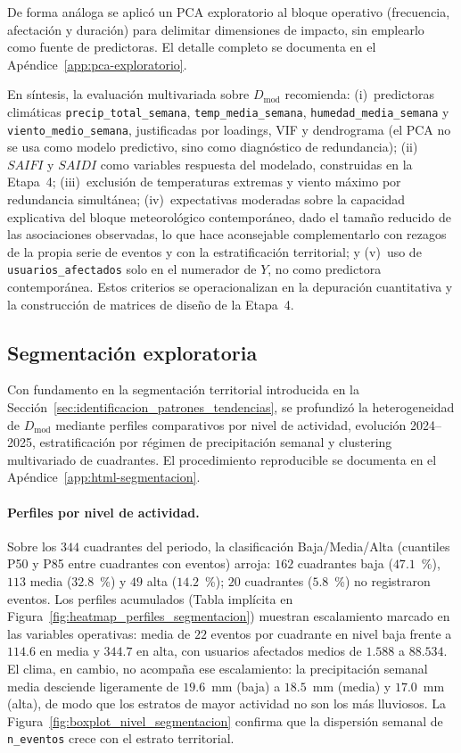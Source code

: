     De forma análoga se aplicó un PCA exploratorio al bloque operativo (frecuencia, afectación y duración) para delimitar dimensiones de impacto, sin emplearlo como fuente de predictoras. El detalle completo se documenta en el Apéndice~\ref{app:pca-exploratorio}.
    
    \noindent En síntesis, la evaluación multivariada sobre $D_{\mathrm{mod}}$ recomienda: (i)~predictoras climáticas \texttt{precip\_total\_semana}, \texttt{temp\_media\_semana}, \texttt{humedad\_media\_semana} y \texttt{viento\_medio\_semana}, justificadas por loadings, VIF y dendrograma (el PCA no se usa como modelo predictivo, sino como diagnóstico de redundancia); (ii)~$SAIFI$ y $SAIDI$ como variables respuesta del modelado, construidas en la Etapa~4; (iii)~exclusión de temperaturas extremas y viento máximo por redundancia simultánea; (iv)~expectativas moderadas sobre la capacidad explicativa del bloque meteorológico contemporáneo, dado el tamaño reducido de las asociaciones observadas, lo que hace aconsejable complementarlo con rezagos de la propia serie de eventos y con la estratificación territorial; y (v)~uso de \texttt{usuarios\_afectados} solo en el numerador de $Y$, no como predictora contemporánea. Estos criterios se operacionalizan en la depuración cuantitativa y la construcción de matrices de diseño de la Etapa~4.
    
\subsection{Segmentación exploratoria}
\label{sec:segmentacion_exploratoria}
    Con fundamento en la segmentación territorial introducida en la Sección~\ref{sec:identificacion_patrones_tendencias}, se profundizó la heterogeneidad de $D_{\mathrm{mod}}$ mediante perfiles comparativos por nivel de actividad, evolución 2024--2025, estratificación por régimen de precipitación semanal y clustering multivariado de cuadrantes. El procedimiento reproducible se documenta en el Apéndice~\ref{app:html-segmentacion}.
    
    \paragraph{Perfiles por nivel de actividad.} Sobre los $344$ cuadrantes del periodo, la clasificación Baja/Media/Alta (cuantiles P50 y P85 entre cuadrantes con eventos) arroja: $162$ cuadrantes baja ($47{.}1$~\%), $113$ media ($32{.}8$~\%) y $49$ alta ($14{.}2$~\%); $20$ cuadrantes ($5{.}8$~\%) no registraron eventos. Los perfiles acumulados (Tabla implícita en Figura~\ref{fig:heatmap_perfiles_segmentacion}) muestran escalamiento marcado en las variables operativas: media de $22$ eventos por cuadrante en nivel baja frente a $114{.}6$ en media y $344{.}7$ en alta, con usuarios afectados medios de $1{.}588$ a $88{.}534$. El clima, en cambio, no acompaña ese escalamiento: la precipitación semanal media desciende ligeramente de $19{.}6$~mm (baja) a $18{.}5$~mm (media) y $17{.}0$~mm (alta), de modo que los estratos de mayor actividad no son los más lluviosos. La Figura~\ref{fig:boxplot_nivel_segmentacion} confirma que la dispersión semanal de \texttt{n\_eventos} crece con el estrato territorial.
    
